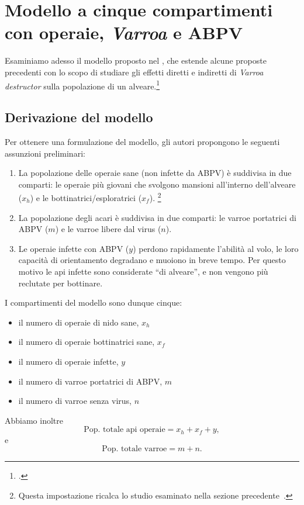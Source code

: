 \section{Modello a cinque compartimenti con operaie, \emph{Varroa} e ABPV}
\label{sec:ratti17}
Esaminiamo adesso il modello proposto nel \citeyear{ratti2017}, che estende alcune proposte precedenti con lo scopo di studiare gli effetti diretti e indiretti di \emph{Varroa destructor} sulla popolazione
di un alveare.\footcite{ratti2017}

\subsection{Derivazione del modello}
Per ottenere una formulazione del modello, gli autori propongono le seguenti assunzioni preliminari:
\begin{enumerate}
    \item La popolazione delle operaie sane (non infette da ABPV) è suddivisa in due comparti: le operaie più giovani che svolgono mansioni all'interno dell'alveare ($x_h$) e le bottinatrici/esploratrici ($x_f$).
    \footnote{Questa impostazione ricalca lo studio esaminato nella sezione
    precedente~\parencite{khoury2011}.}
    \item La popolazione degli acari è suddivisa in due comparti: le varroe portatrici di ABPV ($m$) e le varroe libere dal virus ($n$).
    \item Le operaie infette con ABPV ($y$) perdono rapidamente l'abilità al volo, le loro capacità di
    orientamento degradano e muoiono in breve tempo. Per questo motivo le api infette sono considerate
    ``di alveare'', e non vengono più reclutate per bottinare.
\end{enumerate}

I compartimenti del modello sono dunque cinque:
\begin{itemize}
    \item il numero di operaie di nido sane, $x_h$
    \item il numero di operaie bottinatrici sane, $x_f$
    \item il numero di operaie infette, $y$
    \item il numero di varroe portatrici di ABPV, $m$
    \item il numero di varroe senza virus, $n$
\end{itemize}

Abbiamo inoltre
$$\text{Pop. totale api operaie} = x_h + x_f + y,$$
e
$$\text{Pop. totale varroe} = m + n.$$

